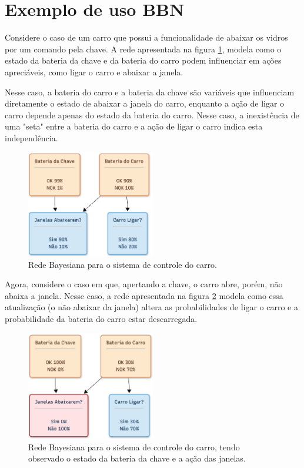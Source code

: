 \section{Exemplo de uso BBN}

Considere o caso de um carro que possui a funcionalidade de abaixar os vidros por um comando pela chave. A rede apresentada na figura \ref{fig:bateria1}, modela como o estado da bateria da chave e da bateria do carro podem influenciar em ações apreciáveis, como ligar o carro e abaixar a janela. 

Nesse caso, a bateria do carro e a bateria da chave são variáveis que influenciam diretamente o estado de abaixar a janela do carro, enquanto a ação de ligar o carro depende apenas do estado da bateria do carro. Nesse caso, a inexistência de uma "seta" entre a bateria do carro e a ação de ligar o carro indica esta independência.


\begin{figure}[H]
  \centering
  \includegraphics[width=0.5\textwidth]{Cap3/BateriaCarro1.png}
  \caption{Rede Bayesiana para o sistema de controle do carro.}
  \label{fig:bateria1}
\end{figure}

Agora, considere o caso em que, apertando a chave, o carro abre, porém, não abaixa a janela. Nesse caso, a rede apresentada na figura \ref{fig:bateria2} modela como essa atualização (o não abaixar da janela) altera as probabilidades de ligar o carro e a probabilidade da bateria do carro estar descarregada.

\begin{figure}[H]
  \centering
  \includegraphics[width=0.5\textwidth]{Cap3/BateriaCarro2.png}
  \caption{Rede Bayesiana para o sistema de controle do carro, tendo observado o estado da bateria da chave e a ação das janelas.}
  \label{fig:bateria2}
\end{figure}

